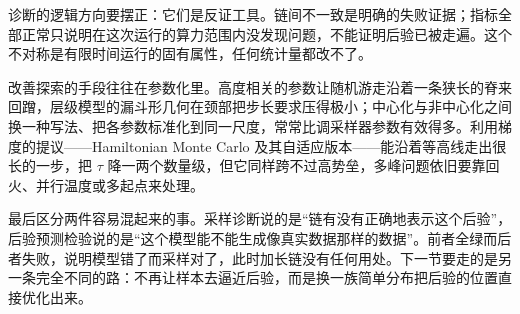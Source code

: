诊断的逻辑方向要摆正：它们是反证工具。链间不一致是明确的失败证据；指标全部正常只说明在这次运行的算力范围内没发现问题，不能证明后验已被走遍。这个不对称是有限时间运行的固有属性，任何统计量都改不了。

改善探索的手段往往在参数化里。高度相关的参数让随机游走沿着一条狭长的脊来回蹭，层级模型的漏斗形几何在颈部把步长要求压得极小；中心化与非中心化之间换一种写法、把各参数标准化到同一尺度，常常比调采样器参数有效得多。利用梯度的提议——Hamiltonian Monte Carlo 及其自适应版本——能沿着等高线走出很长的一步，把 \(\tau\) 降一两个数量级，但它同样跨不过高势垒，多峰问题依旧要靠回火、并行温度或多起点来处理。

最后区分两件容易混起来的事。采样诊断说的是``链有没有正确地表示这个后验''，后验预测检验说的是``这个模型能不能生成像真实数据那样的数据''。前者全绿而后者失败，说明模型错了而采样对了，此时加长链没有任何用处。下一节要走的是另一条完全不同的路：不再让样本去逼近后验，而是换一族简单分布把后验的位置直接优化出来。
